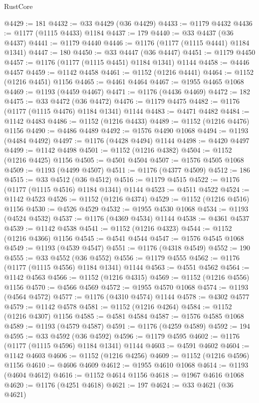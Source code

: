 \begin{lexlean}{RustCore}
\begin{coremodule}
@4429 := 181
@4432 := @33 @4429 (@36 @4429)
@4433 := @1179 @4432
@4436 := @1177 (@1115 @4433) @1184
@4437 := 179
@4440 := @33 @4437 (@36 @4437)
@4441 := @1179 @4440
@4446 := @1176 (@1177 (@1115 @4441) @1184 @1341)
@4447 := 180
@4450 := @33 @4447 (@36 @4447)
@4451 := @1179 @4450
@4457 := @1176 (@1177 (@1115 @4451) @1184 @1341) @1144
@4458 := @4446 @4457
@4459 := @1142 @4458
@4461 := @1152 (@1216 @4441)
@4464 := @1152 (@1216 @4451) @1156
@4465 := @4461 @4464
@4467 := @1955 @4465 @1068
@4469 := @1193 (@4459 @4467)
@4471 := @1176 (@4436 @4469)
@4472 := 182
@4475 := @33 @4472 (@36 @4472)
@4476 := @1179 @4475
@4482 := @1176 (@1177 (@1115 @4476) @1184 @1341) @1144
@4483 := @4471 @4482
@4484 := @1142 @4483
@4486 := @1152 (@1216 @4433)
@4489 := @1152 (@1216 @4476) @1156
@4490 := @4486 @4489
@4492 := @1576 @4490 @1068
@4494 := @1193 (@4484 @4492)
@4497 := @1176 (@4428 @4494) @1144
@4498 := @4420 @4497
@4499 := @1142 @4498
@4501 := @1152 (@1216 @4382)
@4504 := @1152 (@1216 @4425) @1156
@4505 := @4501 @4504
@4507 := @1576 @4505 @1068
@4509 := @1193 (@4499 @4507)
@4511 := @1176 (@4377 @4509)
@4512 := 186
@4515 := @33 @4512 (@36 @4512)
@4516 := @1179 @4515
@4522 := @1176 (@1177 (@1115 @4516) @1184 @1341) @1144
@4523 := @4511 @4522
@4524 := @1142 @4523
@4526 := @1152 (@1216 @4374)
@4529 := @1152 (@1216 @4516) @1156
@4530 := @4526 @4529
@4532 := @1955 @4530 @1068
@4534 := @1193 (@4524 @4532)
@4537 := @1176 (@4369 @4534) @1144
@4538 := @4361 @4537
@4539 := @1142 @4538
@4541 := @1152 (@1216 @4323)
@4544 := @1152 (@1216 @4366) @1156
@4545 := @4541 @4544
@4547 := @1576 @4545 @1068
@4549 := @1193 (@4539 @4547)
@4551 := @1176 (@4318 @4549)
@4552 := 190
@4555 := @33 @4552 (@36 @4552)
@4556 := @1179 @4555
@4562 := @1176 (@1177 (@1115 @4556) @1184 @1341) @1144
@4563 := @4551 @4562
@4564 := @1142 @4563
@4566 := @1152 (@1216 @4315)
@4569 := @1152 (@1216 @4556) @1156
@4570 := @4566 @4569
@4572 := @1955 @4570 @1068
@4574 := @1193 (@4564 @4572)
@4577 := @1176 (@4310 @4574) @1144
@4578 := @4302 @4577
@4579 := @1142 @4578
@4581 := @1152 (@1216 @4264)
@4584 := @1152 (@1216 @4307) @1156
@4585 := @4581 @4584
@4587 := @1576 @4585 @1068
@4589 := @1193 (@4579 @4587)
@4591 := @1176 (@4259 @4589)
@4592 := 194
@4595 := @33 @4592 (@36 @4592)
@4596 := @1179 @4595
@4602 := @1176 (@1177 (@1115 @4596) @1184 @1341) @1144
@4603 := @4591 @4602
@4604 := @1142 @4603
@4606 := @1152 (@1216 @4256)
@4609 := @1152 (@1216 @4596) @1156
@4610 := @4606 @4609
@4612 := @1955 @4610 @1068
@4614 := @1193 (@4604 @4612)
@4616 := @1152 @4614 @1156
@4618 := @1967 @4616 @1068
@4620 := @1176 (@4251 @4618)
@4621 := 197
@4624 := @33 @4621 (@36 @4621)

\end{coremodule}
\end{lexlean}
